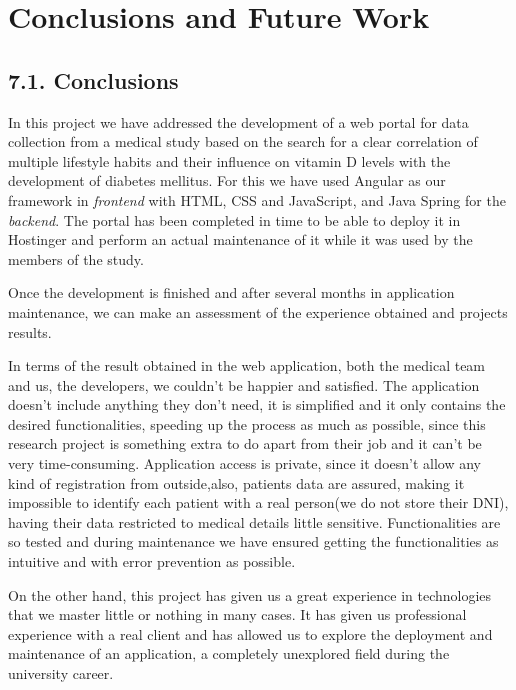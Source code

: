 \chapter*{Conclusions and Future Work}

\section*{7.1. Conclusions}
    In this project we have addressed the development of a web portal for data collection from a medical study based on the search for a clear correlation of multiple lifestyle habits and their influence on vitamin D levels with the development of diabetes mellitus. For this we have used Angular as our framework in \textit{frontend} with HTML, CSS and JavaScript, and Java Spring for the \textit{backend}. The portal has been completed in time to be able to deploy it in Hostinger and perform an actual maintenance of it while it was used by the members of the study.\newline

    Once the development is finished and after several months in application maintenance, we can make an assessment of the experience obtained  and projects results. \newline

    In terms of the result obtained in the web application, both the medical team and us, the developers, we couldn't be happier and satisfied. The application doesn't include anything they don't need, it is simplified and it only contains the desired functionalities, speeding up the process as much as possible, since this research project is something extra to do apart from their job and it can't be very time-consuming. Application access is private, since it doesn't allow any kind of registration from outside,also, patients data are assured, making it impossible to identify each patient with a real person(we do not store their DNI), having their data restricted  to medical details little sensitive. Functionalities are so tested and during maintenance we have ensured getting the functionalities as intuitive and with error prevention as possible. \newline
    
    On the other hand, this project has given us a great experience in technologies that we master little or nothing in many cases. It has given us professional experience with a real client and has allowed us to explore the deployment and maintenance of an application, a completely unexplored field during the university career. \newline
    
